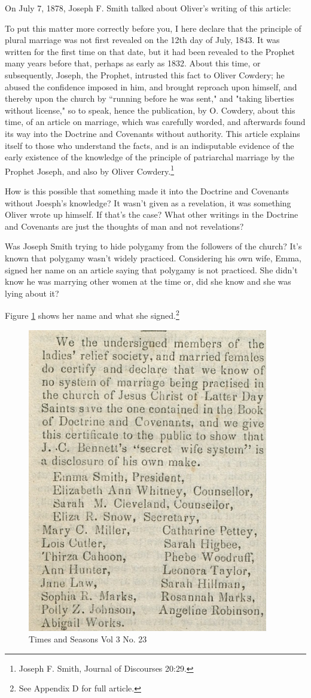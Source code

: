 On July 7, 1878, Joseph F. Smith talked about Oliver's writing of this article:

\begin{displayquote}
To put this matter more correctly before you, I here declare that the principle of 
plural marriage was not first revealed on the 12th day of July, 1843. It was 
written for the first time on that date, but it had been revealed to the Prophet 
many years before that, perhaps as early as 1832. About this time, or 
subsequently, Joseph, the Prophet, intrusted this fact to Oliver Cowdery; he 
abused the confidence imposed in him, and brought reproach upon himself, and 
thereby upon the church by ``running before he was sent," and "taking liberties 
without license," so to speak, hence the publication, by O. Cowdery, about this 
time, of an article on marriage, which was carefully worded, and afterwards found 
its way into the Doctrine and Covenants without authority. This article explains 
itself to those who understand the facts, and is an indisputable evidence of the 
early existence of the knowledge of the principle of patriarchal marriage by the 
Prophet Joseph, and also by Oliver Cowdery.\footnote{Joseph F. Smith, Journal of 
Discourses 20:29.}
\end{displayquote}

How is this possible that something made it into the Doctrine and Covenants without
Joesph's knowledge? It wasn't given as a revelation, it was something Oliver wrote up
himself. If that's the case? What other writings in the Doctrine and Covenants are
just the thoughts of man and not revelations?

Was Joseph Smith trying to hide polygamy from the followers of the church? It's known
that polygamy wasn't widely practiced. Considering his own wife, Emma, signed her
name on an article saying that polygamy is not practiced. She didn't know he was
marrying other women at the time or, did she know and she was lying about it?

Figure \ref{fig:tas1} shows her name and what she signed.\footnote{See Appendix D for
full article.}

\begin{figure}[h!]
  \centering
  \includegraphics[width=0.4\linewidth]{articles/images/polygamy.png}
  \caption{Times and Seasons Vol 3 No. 23}
  \label{fig:tas1}
\end{figure}

